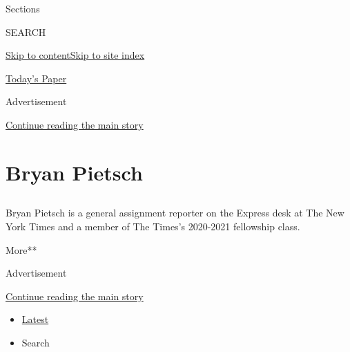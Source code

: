 Sections

SEARCH

\protect\hyperlink{site-content}{Skip to
content}\protect\hyperlink{site-index}{Skip to site index}

\href{https://myaccount.nytimes.com/auth/login?response_type=cookie\&client_id=vi}{}

\href{https://www.nytimes.com/section/todayspaper}{Today's Paper}

Advertisement

\protect\hyperlink{after-top}{Continue reading the main story}

\hypertarget{bryan-pietsch}{%
\section{Bryan Pietsch}\label{bryan-pietsch}}

\subsection{}

Bryan Pietsch is a general assignment reporter on the Express desk at
The New York Times and a member of The Times's 2020-2021 fellowship
class.

More**

Advertisement

\protect\hyperlink{after-mid1}{Continue reading the main story}

\begin{itemize}
\tightlist
\item
  \protect\hyperlink{stream-panel}{Latest}
\item
  Search
\end{itemize}


